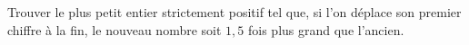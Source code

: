 Trouver le plus petit entier strictement positif tel que, si l'on déplace son premier chiffre à la fin, le nouveau nombre soit $1{,}5$ fois plus grand que l'ancien.
